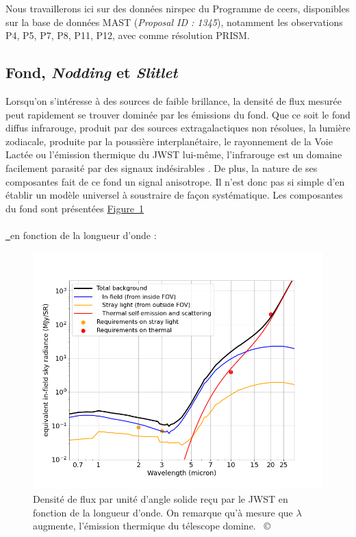 \documentclass[12pt, a4paper]{article}
\newcommand{\customcite}[1]{\mbox{
  {\small \copyright} \cite{#1}}
}
\newcommand*{\figref}[2][]{%
  \hyperref[{#2}]{%
    Figure~\ref*{#2}%
    \ifx\\#1\\%
    \else
      \,#1%
    \fi
  }%
}
\begin{document}
Nous travaillerons ici sur des données \gls{nirspec} du Programme de \gls{ceers}, disponibles sur la base de données MAST  (\textit{Proposal ID : 1345}), notamment les observations P4, P5, P7, P8, P11, P12, avec comme résolution PRISM.

\subsection{Fond, \textit{Nodding} et \textit{Slitlet}}

Lorsqu'on s'intéresse à des sources de faible brillance, la densité de flux mesurée peut rapidement se trouver dominée par les émissions du fond. Que ce soit le fond diffus infrarouge, produit par des sources extragalactiques non résolues, la lumière zodiacale, produite par la poussière interplanétaire, le rayonnement de la Voie Lactée ou l'émission thermique du JWST lui-même, l'infrarouge est un domaine facilement parasité par des signaux indésirables . De plus, la nature de ses composantes fait de ce fond un signal anisotrope. Il n'est donc pas si simple d'en établir un modèle universel à soustraire de façon systématique. Les composantes du fond sont présentées \figref{fig:background_jwst} en fonction de la longueur d'onde : 

\begin{figure}[!h]
  \centering
  \includegraphics[scale=0.55]{assets/background_jwst.png}
  \caption{Densité de flux par unité d'angle solide reçu par le JWST en fonction de la longueur d'onde. On remarque qu'à mesure que $\lambda$ augmente, l'émission thermique du télescope domine. \customcite{jwst_background}}
  \label{fig:background_jwst}
\end{figure}
\end{document}

